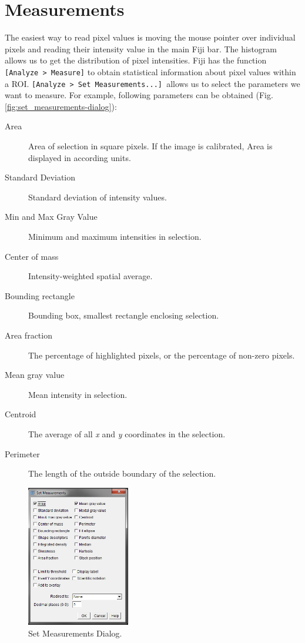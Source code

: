 \section{Measurements}

The easiest way to read pixel values is moving the mouse pointer over individual pixels and reading their intensity value in the main Fiji bar. The histogram allows us to get the distribution of pixel intensities. Fiji has the function \texttt{[Analyze > Measure]} to obtain statistical information about pixel values within a ROI. \texttt{[Analyze > Set Measurements...] }allows us to select the parameters we want to measure. For example, following parameters can be obtained (Fig. \ref{fig:set_measurements-dialog}):
\begin{description}
	\item[Area] Area of selection in square pixels. If the image is calibrated, Area is displayed in according units.
	\item[Standard Deviation] Standard deviation of intensity values.
	\item[Min and Max Gray Value] Minimum and maximum intensities in selection.
	\item[Center of mass] Intensity-weighted spatial average.
	\item[Bounding rectangle] Bounding box, smallest rectangle enclosing selection.
	\item[Area fraction] The percentage of highlighted pixels, or the percentage of non-zero pixels.
	\item[Mean gray value] Mean intensity in selection.
	\item[Centroid] The average of all \emph{x} and \emph{y} coordinates in the selection.
	\item[Perimeter] The length of the outside boundary of the selection.
\end{description}

\begin{figure}[!ht]
	\begin{center}
		\includegraphics[width=0.4\textwidth]{mod2/figures/set-measurements-dialog.png}
		\caption{Set Measurements Dialog.}\label{fig:set-measurements-dialog}
	\end{center}
\end{figure}

